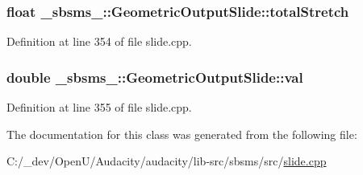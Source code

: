 \subsubsection[{\texorpdfstring{total\+Stretch}{totalStretch}}]{\setlength{\rightskip}{0pt plus 5cm}float \+\_\+sbsms\+\_\+\+::\+Geometric\+Output\+Slide\+::total\+Stretch\hspace{0.3cm}{\ttfamily [protected]}}\hypertarget{class__sbsms___1_1_geometric_output_slide_a7e4a4a96e8aa6ba3a1c659c8dbe08983}{}\label{class__sbsms___1_1_geometric_output_slide_a7e4a4a96e8aa6ba3a1c659c8dbe08983}


Definition at line 354 of file slide.\+cpp.

\subsubsection[{\texorpdfstring{val}{val}}]{\setlength{\rightskip}{0pt plus 5cm}double \+\_\+sbsms\+\_\+\+::\+Geometric\+Output\+Slide\+::val\hspace{0.3cm}{\ttfamily [protected]}}\hypertarget{class__sbsms___1_1_geometric_output_slide_a47324460a87eb315bef9765f84d69c6a}{}\label{class__sbsms___1_1_geometric_output_slide_a47324460a87eb315bef9765f84d69c6a}


Definition at line 355 of file slide.\+cpp.



The documentation for this class was generated from the following file\+:\begin{DoxyCompactItemize}
\item 
C\+:/\+\_\+dev/\+Open\+U/\+Audacity/audacity/lib-\/src/sbsms/src/\hyperlink{slide_8cpp}{slide.\+cpp}\end{DoxyCompactItemize}

